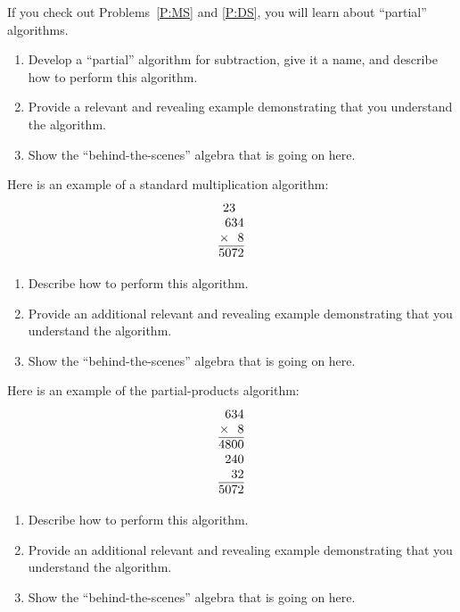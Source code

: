 \documentclass[nooutcomes]{ximera}
\begin{document}
\begin{problem}If you check out Problems~\ref{P:MS} and \ref{P:DS}, you will
  learn about ``partial'' algorithms.
\begin{enumerate}
\item Develop a ``partial'' algorithm for subtraction, give it a name, and describe how to
  perform this algorithm.
\item Provide a relevant and revealing example demonstrating that you
  understand the algorithm.
\item Show the ``behind-the-scenes'' algebra that is going on here.
\end{enumerate}
\end{problem} 

\begin{problem}Here is an example of a standard multiplication algorithm:
\[
\begin{array}{@{}r@{}}
23~~\\
634\\
\times~~8\\ \hline
5072
\end{array}
\]
\begin{enumerate}
\item Describe how to perform this algorithm.
\item Provide an additional relevant and revealing example
  demonstrating that you understand the algorithm.
\item Show the ``behind-the-scenes'' algebra that is going on here.
\end{enumerate}
\end{problem} 

\begin{problem}\label{P:MS} Here is an example of the partial-products 
  algorithm: 
\[
\begin{array}{@{}r@{}}
634\\
\times~~8\\ \hline
4800\\
240\\
32\\ \hline
5072
\end{array}
\]
\begin{enumerate}
\item Describe how to perform this algorithm.
\item Provide an additional relevant and revealing example
  demonstrating that you understand the algorithm.
\item Show the ``behind-the-scenes'' algebra that is going on here.
\end{enumerate}
\end{problem} 
\end{document}
